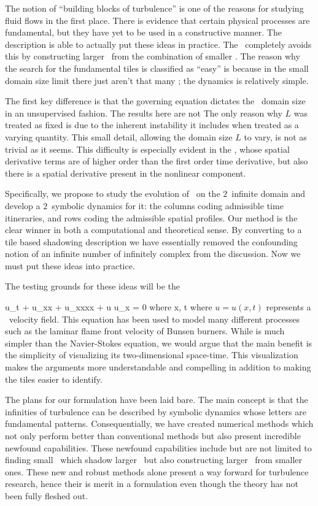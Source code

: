The notion of ``building blocks of turbulence'' is one of the reasons for
studying fluid flows in the first place. There is evidence that certain
physical processes are fundamental, but they have yet to be used in a
constructive manner. The {\spt} description is able to actually put
these ideas in practice.
The \spt\ completely avoids this by constructing larger \twots\
from the combination of smaller \twots.
The reason
why the search for the fundamental tiles is classified as ``easy'' is because
in the small domain size limit there just aren't that many \twots; the dynamics
is relatively simple.

The first key difference is that the governing equation
dictates the \spt\ domain size in an unsupervised
fashion. The results here are not
The only reason why $L$ was treated as fixed is due to the
inherent instability it includes when treated as a varying quantity.
This small detail, allowing the domain size $L$ to vary,
is not as trivial as it seems.
 This difficulty
is especially evident in the \KSe, whose spatial derivative terms
are of higher order than the first order time derivative, but also
there is a spatial derivative present in the nonlinear component.

Specifically, we propose to study the evolution of \KS\ on the $2$\dmn\
infinite {\spt}domain and develop a $2$\dmn\ symbolic dynamics for it:
the columns coding admissible time itineraries, and rows coding the
admissible spatial profiles. Our {\spt} method is the clear winner in
both a computational and theoretical sense. By converting to a tile based
shadowing description we have essentially removed the confounding notion
of an infinite number of infinitely complex {\twots} from the discussion.
Now we must put these ideas into practice.

The testing grounds for these ideas will be the \spt\ \KSe

\beq \label{e-ks}
u_t + u_{xx} + u_{xxxx} + u u_x = 0 \quad \mbox{where} \quad x\in[0,\speriod{}], t\in[0,\period{}]
\eeq
where $u = u(x, t)$ represents a \spt\ velocity field. This
equation has been used to model many different processes such as
the laminar flame front velocity of Bunsen burners.
While \refeq{e-ks} is much simpler than the {\spt} Navier-Stokes equation,
we would argue that the main benefit is the simplicity of
visualizing its two-dimensional space-time. This visualization
makes the arguments more understandable and compelling in addition
to making the tiles easier to identify.

The plans for our {\spt} formulation have been laid bare. The main concept is that the infinities
of turbulence can be described by {\spt} symbolic dynamics whose letters are fundamental {\spt}
patterns. Consequentially, we have created numerical methods which not only perform better than
conventional methods but also present incredible newfound capabilities. These newfound capabilities
include but are not limited to finding small \twots\ which shadow larger \twots\ but also constructing
larger \twots\ from smaller ones. These new and robust methods alone present a way forward for turbulence research, hence their is merit in a {\spt} formulation even though the theory has not
been fully fleshed out.

